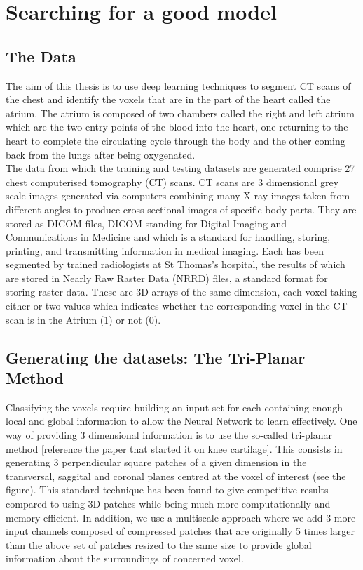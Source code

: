 \chapter{Searching for a good model}

\section{The Data}

The aim of this thesis is to use deep learning techniques to segment CT scans of the chest and identify the voxels that are in the part of the heart called the atrium. The atrium is composed of two chambers called the right and left atrium which are the two entry points of the blood into the heart, one returning to the heart to complete the circulating cycle through the body and the other coming back from the lungs after being oxygenated.\\

The data from which the training and testing datasets are generated comprise 27 chest computerised tomography (CT) scans. CT scans are 3 dimensional grey scale images generated via computers combining many X-ray images taken from different angles to produce cross-sectional images of specific body parts. They are stored as DICOM files, DICOM standing for Digital Imaging and Communications in Medicine and which is a standard for handling, storing, printing, and transmitting information in medical imaging. Each has been segmented by trained radiologists at St Thomas's hospital, the results of which are stored in Nearly Raw Raster Data (NRRD) files, a standard format for storing raster data. These are 3D arrays of the same dimension, each voxel taking either or two values which indicates whether the corresponding voxel in the CT scan is in the Atrium (1) or not (0). 

\section{Generating the datasets: The Tri-Planar Method}

Classifying the voxels require building an input set for each containing enough local and global information to allow the Neural Network to learn effectively. One way of providing 3 dimensional information is to use the so-called tri-planar method [reference the paper that started it on knee cartilage]. This consists in generating 3 perpendicular square patches of a given dimension in the transversal, saggital and coronal planes centred at the voxel of interest (see the figure). This standard technique has been found to give competitive results compared to using 3D patches while being much more computationally and memory efficient. In addition, we use a multiscale approach where we add 3 more input channels composed of compressed patches that are originally 5 times larger than the above set of patches resized to the same size to provide global information about the surroundings of concerned voxel.\\

